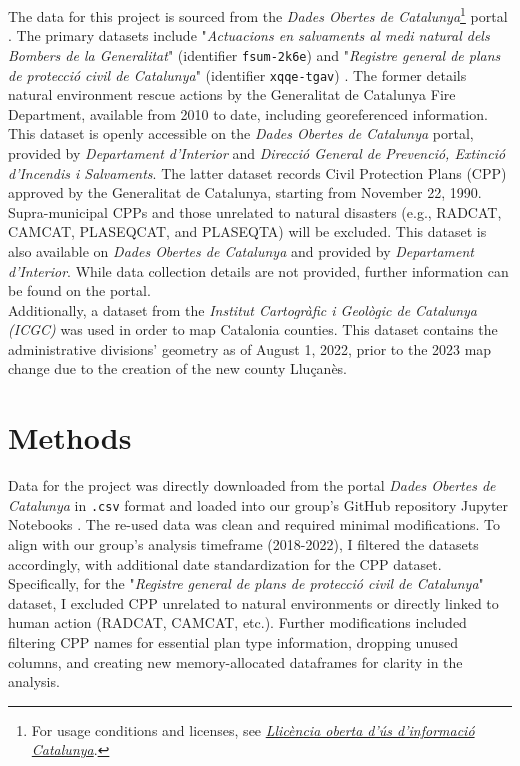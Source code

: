 \documentclass[
  journal=small,
  manuscript=mini-article,  %
  year=2023,
  volume=1,
]{odj-journal}
\begin{document}
The data for this project is sourced from the \textit{Dades Obertes de Catalunya}\footnote{For usage conditions and licenses, see \href{https://governobert.gencat.cat/ca/dades_obertes/llicencia-oberta-informacio-catalunya/}{\textit{Llicència oberta d'ús d'informació Catalunya}}.} portal \cite{dades_obertes}. The primary datasets include "\textit{Actuacions en salvaments al medi natural dels Bombers de la Generalitat}" (identifier \texttt{fsum-2k6e}) \cite{fd_rescue} and "\textit{Registre general de plans de protecció civil de Catalunya}" (identifier \texttt{xqqe-tgav}) \cite{CPP}. The former details natural environment rescue actions by the Generalitat de Catalunya Fire Department, available from 2010 to date, including georeferenced information. This dataset is openly accessible on the \textit{Dades Obertes de Catalunya} portal, provided by \textit{Departament d'Interior} and \textit{Direcció General de Prevenció, Extinció d'Incendis i Salvaments}. The latter dataset records Civil Protection Plans (CPP) approved by the Generalitat de Catalunya, starting from November 22, 1990. Supra-municipal CPPs and those unrelated to natural disasters (e.g., RADCAT, CAMCAT, PLASEQCAT, and PLASEQTA) will be excluded. This dataset is also available on \textit{Dades Obertes de Catalunya} and provided by \textit{Departament d'Interior}. While data collection details are not provided, further information can be found on the portal.\\

Additionally, a dataset from the \textit{Institut Cartogràfic i Geològic de Catalunya (ICGC)} \cite{geo_dades} was used in order to map Catalonia counties. This dataset contains the administrative divisions' geometry as of August 1, 2022, prior to the 2023 map change due to the creation of the new county Lluçanès.

\section{Methods}\label{sec:methods}
Data for the project was directly downloaded from the portal \textit{Dades Obertes de Catalunya} in \texttt{.csv} format and loaded into our group's GitHub repository Jupyter Notebooks \cite{github_repo}. The re-used data was clean and required minimal modifications. To align with our group's analysis timeframe (2018-2022), I filtered the datasets accordingly, with additional date standardization for the CPP dataset. Specifically, for the "\textit{Registre general de plans de protecció civil de Catalunya}" dataset, I excluded CPP unrelated to natural environments or directly linked to human action (RADCAT, CAMCAT, etc.). Further modifications included filtering CPP names for essential plan type information, dropping unused columns, and creating new memory-allocated dataframes for clarity in the analysis.\\
\end{document}
